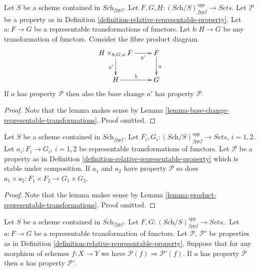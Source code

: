 \begin{lemma}
\label{lemma-base-change-representable-transformations-property}
Let $S$ be a scheme contained in $\textit{Sch}_{fppf}$.
Let $F, G, H : (\textit{Sch}/S)_{fppf}^{opp} \to \textit{Sets}$.
Let $\mathcal{P}$ be a property as in
Definition \ref{definition-relative-representable-property}.
Let $a : F \to G$ be a representable transformations of functors.
Let $b : H \to G$ be any transformation of functors.
Consider the fibre product diagram
$$
\xymatrix{
H \times_{b, G, a} F \ar[r]_-{b'} \ar[d]_{a'} & F \ar[d]^a \\
H \ar[r]^b & G
}
$$
If $a$ has property $\mathcal{P}$ then also the base change $a'$
has property $\mathcal{P}$.
\end{lemma}

\begin{proof}
Note that the lemma makes sense by
Lemma \ref{lemma-base-change-representable-transformations}.
Proof omitted.
\end{proof}

\begin{lemma}
\label{lemma-product-representable-transformations-property}
Let $S$ be a scheme contained in $\textit{Sch}_{fppf}$.
Let $F_i, G_i : (\textit{Sch}/S)_{fppf}^{opp} \to \textit{Sets}$,
$i = 1, 2$.
Let $a_i : F_i \to G_i$, $i = 1, 2$ be representable transformations
of functors.
Let $\mathcal{P}$ be a property as in
Definition \ref{definition-relative-representable-property}
which is stable under composition.
If $a_1$ and $a_2$ have property $\mathcal{P}$ so does
$a_1 \times a_2 : F_1 \times F_2 \longrightarrow G_1 \times G_2$.
\end{lemma}

\begin{proof}
Note that the lemma makes sense by
Lemma \ref{lemma-product-representable-transformations}.
Proof omitted.
\end{proof}

\begin{lemma}
\label{lemma-representable-transformations-property-implication}
Let $S$ be a scheme contained in $\textit{Sch}_{fppf}$.
Let $F, G : (\textit{Sch}/S)_{fppf}^{opp} \to \textit{Sets}$,.
Let $a : F \to G$ be a representable transformation of functors.
Let $\mathcal{P}$, $\mathcal{P}'$ be properties as in
Definition \ref{definition-relative-representable-property}.
Suppose that for any morphism of schemes $f : X \to Y$
we have $\mathcal{P}(f) \Rightarrow \mathcal{P}'(f)$.
If $a$ has property $\mathcal{P}$ then
$a$ has property $\mathcal{P}'$.
\end{lemma}

